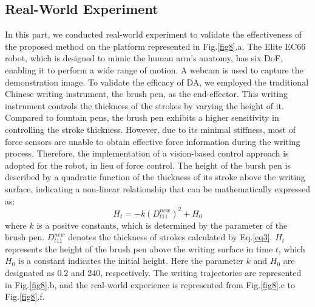 \documentclass[journal]{IEEEtran}
\begin{document}
\subsection{Real-World Experiment}
In this part, we conducted real-world experiment to validate the effectiveness of the proposed method on the platform represented in Fig.\ref{fig8}.a. The Elite EC66 robot, which is designed to mimic the human arm's anatomy, has six DoF, enabling it to perform a wide range of motion. A webcam is used to capture the demonstration image. To validate the efficacy of DA, we employed the traditional Chinese writing instrument, the brush pen, as the end-effector. This writing instrument controls the thickness of the strokes by varying the height of it. Compared to fountain pens, the brush pen exhibits a higher sensitivity in controlling the stroke thickness. However, due to its minimal stiffness, most of force sensors are unable to obtain effective force information during the writing process. Therefore, the implementation of a vision-based control approach is adopted for the robot, in lieu of force control. The height of the bursh pen is described by a quadratic function of the thickness of its stroke above the writing surface\cite{Guo2022}, indicating a non-linear relationship that can be mathematically expressed as:
\begin{equation}
    H_t=-k(D_{t11}^{new})^2+H_0
\end{equation}
where $k$ is a positve constants, which is determined by the parameter of the brush pen. $D_{t11}^{new}$ denotes the thickness of strokes calculated by Eq.\ref{eq3}. $H_t$ represents the height of the brush pen above the writing surface in time $t$, which $H_0$ is a constant indicates the initial height. Here the parameter $k$ and $H_0$ are designated as 0.2 and 240, respectively. The writing trajectories are represented in Fig.\ref{fig8}.b, and the real-world experience is represented from Fig.\ref{fig8}.c to Fig.\ref{fig8}.f.
\end{document}
